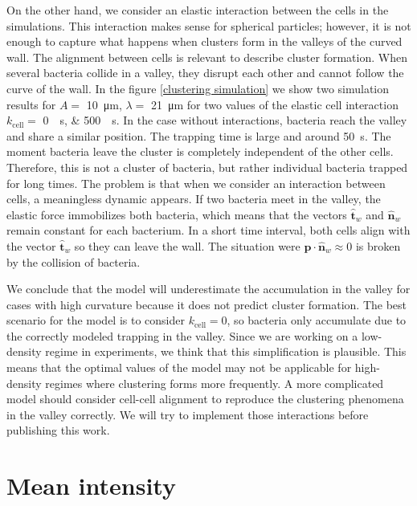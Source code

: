 \newpage

On the other hand, we consider an elastic interaction between the cells in the simulations. This interaction makes sense for spherical particles; however, it is not enough to capture what happens when clusters form in the valleys of the curved wall. The alignment between cells is relevant to describe cluster formation. When several bacteria collide in a valley, they disrupt each other and cannot follow the curve of the wall. In the figure \ref{clustering simulation} we show two simulation results for $A=$ \SI{10}{\micro\meter}, $\lambda=$ \SI{21}{\micro\meter} for two values of the elastic cell interaction $k_{\text{cell}}=$ \SIlist[list-units=single]{0;500}{\per\second}. In the case without interactions, bacteria reach the valley and share a similar position. The trapping time is large and around \SI{50}{\second}. The moment bacteria leave the cluster is completely independent of the other cells. Therefore, this is not a cluster of bacteria, but rather individual bacteria trapped for long times. The problem is that when we consider an interaction between cells, a meaningless dynamic appears. If two bacteria meet in the valley, the elastic force immobilizes both bacteria, which means that the vectors $\hat{\textbf{t}}_w$ and $\hat{\textbf{n}}_w$ remain constant for each bacterium. In a short time interval, both cells align with the vector $\hat{\textbf{t}}_w$ so they can leave the wall. The situation were $\textbf{p}\cdot\hat{\textbf{n}}_w \approx 0$ is broken by the collision of bacteria. 

We conclude that the model will underestimate the accumulation in the valley for cases with high curvature because it does not predict cluster formation. The best scenario for the model is to consider $k_{\text{cell}}=0$, so bacteria only accumulate due to the correctly modeled trapping in the valley. Since we are working on a low-density regime in experiments, we think that this simplification is plausible. This means that the optimal values of the model may not be applicable for high-density regimes where clustering forms more frequently. A more complicated model should consider cell-cell alignment to reproduce the clustering phenomena in the valley correctly. We will try to implement those interactions before publishing this work.
 
\label{section:intensity}
\section{Mean intensity}

